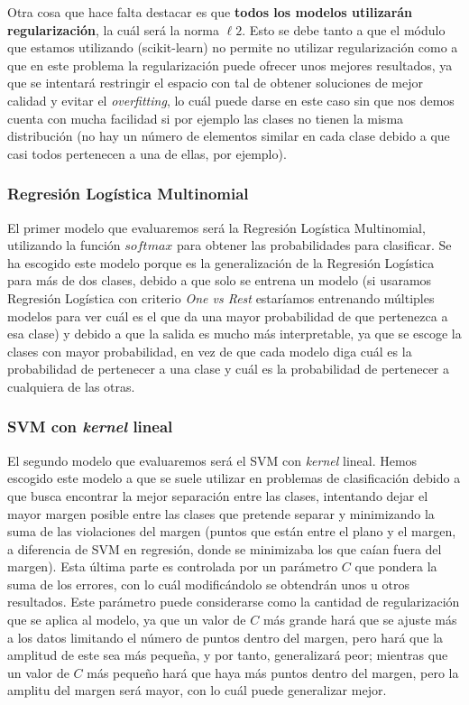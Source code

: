 \documentclass[11pt,a4paper]{article}
\begin{document}
Otra cosa que hace falta destacar es que \textbf{todos los modelos
utilizarán regularización}, la cuál será la norma \(\ell 2\). Esto se
debe tanto a que el módulo que estamos utilizando (scikit-learn) no
permite no utilizar regularización como a que en este problema la
regularización puede ofrecer unos mejores resultados, ya que se
intentará restringir el espacio con tal de obtener soluciones de mejor
calidad y evitar el \emph{overfitting}, lo cuál puede darse en este caso
sin que nos demos cuenta con mucha facilidad si por ejemplo las clases
no tienen la misma distribución (no hay un número de elementos similar
en cada clase debido a que casi todos pertenecen a una de ellas, por
ejemplo).

\subsubsection{Regresión Logística
Multinomial}\label{regresiuxf3n-loguxedstica-multinomial}

El primer modelo que evaluaremos será la Regresión Logística
Multinomial, utilizando la función \(softmax\) para obtener las
probabilidades para clasificar. Se ha escogido este modelo porque es la
generalización de la Regresión Logística para más de dos clases, debido
a que solo se entrena un modelo (si usaramos Regresión Logística con
criterio \emph{One vs Rest} estaríamos entrenando múltiples modelos para
ver cuál es el que da una mayor probabilidad de que pertenezca a esa
clase) y debido a que la salida es mucho más interpretable, ya que se
escoge la clases con mayor probabilidad, en vez de que cada modelo diga
cuál es la probabilidad de pertenecer a una clase y cuál es la
probabilidad de pertenecer a cualquiera de las otras.

\subsubsection{\texorpdfstring{SVM con \emph{kernel}
lineal}{SVM con kernel lineal}}\label{svm-con-kernel-lineal}

El segundo modelo que evaluaremos será el SVM con \emph{kernel} lineal.
Hemos escogido este modelo a que se suele utilizar en problemas de
clasificación debido a que busca encontrar la mejor separación entre las
clases, intentando dejar el mayor margen posible entre las clases que
pretende separar y minimizando la suma de las violaciones del margen
(puntos que están entre el plano y el margen, a diferencia de SVM en
regresión, donde se minimizaba los que caían fuera del margen). Esta
última parte es controlada por un parámetro \(C\) que pondera la suma de
los errores, con lo cuál modificándolo se obtendrán unos u otros
resultados. Este parámetro puede considerarse como la cantidad de
regularización que se aplica al modelo, ya que un valor de \(C\) más
grande hará que se ajuste más a los datos limitando el número de puntos
dentro del margen, pero hará que la amplitud de este sea más pequeña, y
por tanto, generalizará peor; mientras que un valor de \(C\) más pequeño
hará que haya más puntos dentro del margen, pero la amplitu del margen
será mayor, con lo cuál puede generalizar mejor.
\end{document}
